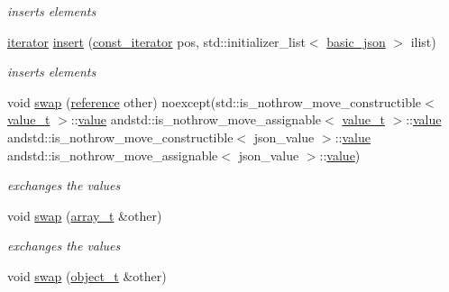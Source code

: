 \begin{DoxyCompactItemize}
\begin{DoxyCompactList}\small\item\em inserts elements \end{DoxyCompactList}\item 
\hyperlink{classnlohmann_1_1basic__json_1_1iterator}{iterator} \hyperlink{classnlohmann_1_1basic__json_aadb4e5be88221e5e28cdb752332f3d13}{insert} (\hyperlink{classnlohmann_1_1basic__json_1_1const__iterator}{const\-\_\-iterator} pos, std\-::initializer\-\_\-list$<$ \hyperlink{classnlohmann_1_1basic__json}{basic\-\_\-json} $>$ ilist)
\begin{DoxyCompactList}\small\item\em inserts elements \end{DoxyCompactList}\item 
void \hyperlink{classnlohmann_1_1basic__json_aafda4fe80657173ac8efa8f862144840}{swap} (\hyperlink{classnlohmann_1_1basic__json_a3ec8e17be8732fe436e9d6733f52b7a3}{reference} other) noexcept(std\-::is\-\_\-nothrow\-\_\-move\-\_\-constructible$<$ \hyperlink{classnlohmann_1_1basic__json_a231b02148577b69a154b2ce2c87a5522}{value\-\_\-t} $>$\-::\hyperlink{classnlohmann_1_1basic__json_a0a2cbbd95862a623e7dc5c37e67dead0}{value} andstd\-::is\-\_\-nothrow\-\_\-move\-\_\-assignable$<$ \hyperlink{classnlohmann_1_1basic__json_a231b02148577b69a154b2ce2c87a5522}{value\-\_\-t} $>$\-::\hyperlink{classnlohmann_1_1basic__json_a0a2cbbd95862a623e7dc5c37e67dead0}{value} andstd\-::is\-\_\-nothrow\-\_\-move\-\_\-constructible$<$ json\-\_\-value $>$\-::\hyperlink{classnlohmann_1_1basic__json_a0a2cbbd95862a623e7dc5c37e67dead0}{value} andstd\-::is\-\_\-nothrow\-\_\-move\-\_\-assignable$<$ json\-\_\-value $>$\-::\hyperlink{classnlohmann_1_1basic__json_a0a2cbbd95862a623e7dc5c37e67dead0}{value})
\begin{DoxyCompactList}\small\item\em exchanges the values \end{DoxyCompactList}\item 
void \hyperlink{classnlohmann_1_1basic__json_a8209621de6184d9eabe136b7c8f61935}{swap} (\hyperlink{classnlohmann_1_1basic__json_ab00b882d39306d663c23dab110f5cae0}{array\-\_\-t} \&other)
\begin{DoxyCompactList}\small\item\em exchanges the values \end{DoxyCompactList}\item 
void \hyperlink{classnlohmann_1_1basic__json_a38ee0f09a318d003add75e0787040794}{swap} (\hyperlink{classnlohmann_1_1basic__json_a0ac9894c9de8dc551cf2e5f1c605537f}{object\-\_\-t} \&other)

\end{DoxyCompactItemize}
